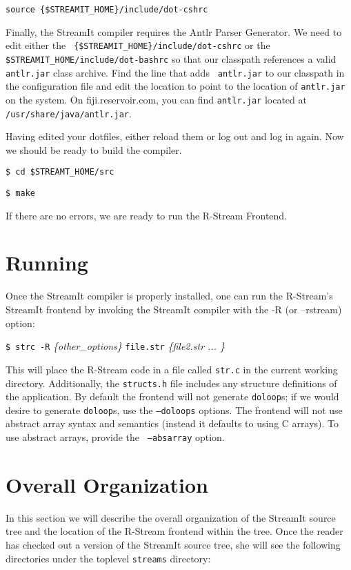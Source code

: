 \documentclass[10pt, letterpaper, onecolumn]{article}
\begin{document}
  {\tt source \{\$STREAMIT\_HOME\}/include/dot-cshrc}
\medskip

Finally, the StreamIt compiler requires the Antlr Parser
Generator\cite{antlr}.  We need to edit either the {\tt
\{\$STREAMIT\_HOME\}/include/dot-cshrc} or the {\tt
\$STREAMIT\_HOME/include/dot-bashrc} so that our classpath references
a valid {\tt antlr.jar} class archive.  Find the line that adds {\tt
antlr.jar} to our classpath in the configuration file and edit the
location to point to the location of {\tt antlr.jar} on the system.
On fiji.reservoir.com, you can find {\tt antlr.jar} located at {\tt
/usr/share/java/antlr.jar}.

Having edited your dotfiles, either reload them or log out and log in
again.  Now we should be ready to build the compiler.

\medskip
{\tt \$ cd \$STREAMT\_HOME/src}

{\tt \$ make}
\medskip

If there are no errors, we are ready to run the R-Stream Frontend.

\section{Running}
Once the StreamIt compiler is properly installed, one can run the R-Stream's
StreamIt frontend by invoking the StreamIt compiler with the -R (or
--rstream) option:  

\medskip
{\tt \$ strc -R} {\it \{other\_options\}} {\tt file.str} {\it \{file2.str ... \}}
\medskip

This will place the R-Stream code in a file called {\tt str.c} in the
current working directory.  Additionally, the {\tt structs.h} file
includes any structure definitions of the application.  By default the
frontend will not generate {\tt doloop}s; if we would desire to
generate {\tt doloop}s, use the {\tt --doloops} options.  The frontend
will not use abstract array syntax and semantics (instead it defaults
to using C arrays).  To use abstract arrays, provide the {\tt
--absarray} option.



\section{Overall Organization}
In this section we will describe the overall organization of the
StreamIt source tree and the location of the R-Stream frontend within
the tree.  Once the reader has checked out a version of the StreamIt
source tree, she will see the following directories under the toplevel
{\tt streams} directory:
\end{document}
